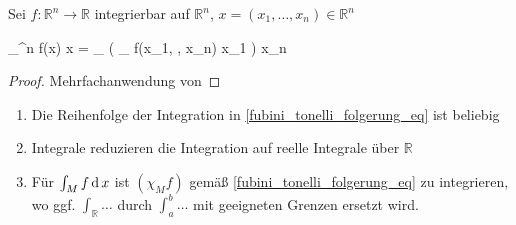 \begin{conclusion}
	Sei $f:\mathbb{R}^n\to\mathbb{R}$ integrierbar auf $\mathbb{R}^n$, $x = (x_1, \dotsc, x_n)\in\mathbb{R}^n$
	\begin{flalign}
		\Rightarrow\;\;\int_{^n} f(x) \D x = \int_ \dotsc \left( \int_ f(x_1, \dotsc, x_n) \D x_1 \right) \dotsc \D x_n
	\end{flalign}
\end{conclusion}
\begin{proof}
	Mehrfachanwendung von 
\end{proof}

\begin{remark}\vspace*{0pt}
	\begin{enumerate}[label={\arabic*)},topsep=\dimexpr -\baselineskip / 2\relax]
		\item Die Reihenfolge der Integration in \eqref{fubini_tonelli_folgerung_eq} ist beliebig
		\item Integrale reduzieren die Integration auf reelle Integrale über $\mathbb{R}$
		\item Für $\int_M f \operatorname{d} x$ ist $(\chi_M f)$ gemäß \eqref{fubini_tonelli_folgerung_eq} zu integrieren, wo ggf. $\int_{\mathbb{R}}\dotsc$ durch $\int_a^b\dotsc$ mit geeigneten Grenzen ersetzt wird.
	\end{enumerate}
\end{remark}

